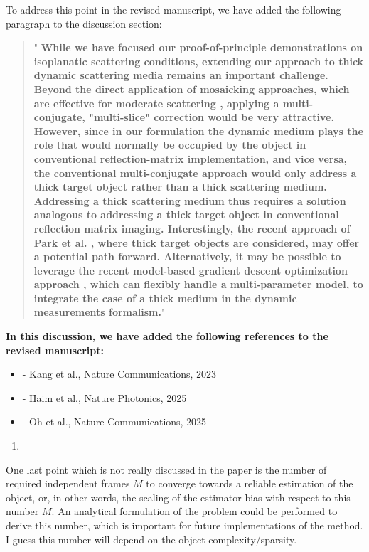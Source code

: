 \documentclass[12pt]{article}
\newenvironment{solved_reviewercomment}
    {\begin{tcolorbox}[width=\linewidth,colback=gray!5,colframe=solved_commentcolor!50,title=Reviewer Comment,left=5pt,right=5pt]}
    {\end{tcolorbox}}
\newenvironment{finished_ourresponse}
    {\begin{tcolorbox}[width=\linewidth,breakable,enhanced,colback=gray!5,colframe=finished_responsecolor!50,title=Response,left=5pt,right=5pt]}
    {\end{tcolorbox}}
\begin{document}
\begin{finished_ourresponse}
    To address this point in the revised manuscript, we have added the following paragraph to the discussion section:
    \begin{quote}
        "{\bfseries
        While we have focused our proof-of-principle demonstrations on isoplanatic scattering conditions, extending our approach to thick dynamic scattering media remains an important challenge. Beyond the direct application of mosaicking approaches, which are effective for moderate scattering \cite{lee22, najar2024harnessing}, applying a multi-conjugate, "multi-slice" correction \cite{kang2023tracing, haim2025image} would be very attractive. However, since in our formulation the dynamic medium plays the role that would normally be occupied by the object in conventional reflection-matrix implementation, and vice versa, the conventional multi-conjugate approach would only address a thick target object rather than a thick scattering medium. Addressing a thick scattering medium thus requires a solution analogous to addressing a thick target object in conventional reflection matrix imaging. Interestingly, the recent approach of Park et al. \cite{oh2025digital}, where thick target objects are considered, may offer a potential path forward. 
        Alternatively, it may be possible to leverage the recent model-based gradient descent optimization approach  \cite{haim2025image}, which can flexibly handle a multi-parameter model, to integrate the case of a thick medium in the dynamic measurements formalism.}"
    \end{quote}

    \textbf{In this discussion, we have added the following references to the revised manuscript:}
    \begin{itemize}[nosep]
    \item \cite{kang2023tracing} - Kang et al., Nature Communications, 2023
    \item \cite{haim2025image} - Haim et al., Nature Photonics, 2025
    \item \cite{oh2025digital} - Oh et al., Nature Communications, 2025
    \end{itemize}
    
\end{finished_ourresponse}

\begin{enumerate}[label=\arabic*., resume]
\item \leavevmode
\end{enumerate}
\vspace{-1em}
\begin{solved_reviewercomment}
    One last point which is not really discussed in the paper is the number of required independent frames \(M\) to converge towards a reliable estimation of the object, or, in other words, the scaling of the estimator bias with respect to this number \(M\). An analytical formulation of the problem could be performed to derive this number, which is important for future implementations of the method. I guess this number will depend on the object complexity/sparsity.
\end{solved_reviewercomment}
    
\end{document}
